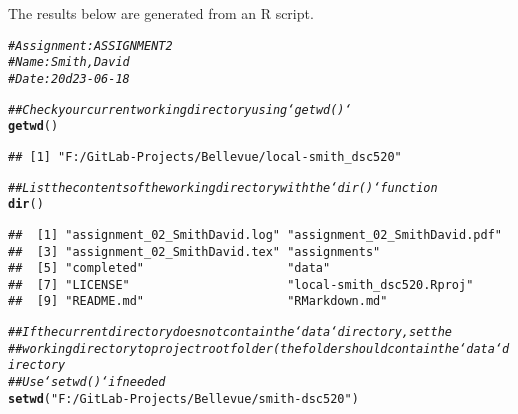 \documentclass{article}\usepackage[]{graphicx}\usepackage[]{xcolor}
\makeatletter
\newcommand{\hlstr}[1]{\textcolor[rgb]{0.192,0.494,0.8}{#1}}%
\newcommand{\hlcom}[1]{\textcolor[rgb]{0.678,0.584,0.686}{\textit{#1}}}%
\newcommand{\hlstd}[1]{\textcolor[rgb]{0.345,0.345,0.345}{#1}}%
\newcommand{\hlkwd}[1]{\textcolor[rgb]{0.737,0.353,0.396}{\textbf{#1}}}%
\newenvironment{kframe}{%
 \def\at@end@of@kframe{}%
 \ifinner\ifhmode%
  \def\at@end@of@kframe{\end{minipage}}%
  \begin{minipage}{\columnwidth}%
 \fi\fi%
 \def\FrameCommand##1{\hskip\@totalleftmargin \hskip-\fboxsep
 \colorbox{shadecolor}{##1}\hskip-\fboxsep
     \hskip-\linewidth \hskip-\@totalleftmargin \hskip\columnwidth}%
 \MakeFramed {\advance\hsize-\width
   \@totalleftmargin\z@ \linewidth\hsize
   \@setminipage}}%
 {\par\unskip\endMakeFramed%
 \at@end@of@kframe}
\newenvironment{knitrout}{}{} %
\makeatother
\begin{document}
\title{\title{\title{\title{\title{\title{}}}}}}



\maketitle
The results below are generated from an R script.

\begin{knitrout}
\color{fgcolor}\begin{kframe}
\begin{alltt}
\hlcom{# Assignment: ASSIGNMENT 2}
\hlcom{# Name: Smith, David}
\hlcom{# Date: 20d23-06-18}

\hlcom{## Check your current working directory using `getwd()`}
\hlkwd{getwd}\hlstd{()}
\end{alltt}
\begin{verbatim}
## [1] "F:/GitLab-Projects/Bellevue/local-smith_dsc520"
\end{verbatim}
\begin{alltt}
\hlcom{## List the contents of the working directory with the `dir()` function}
\hlkwd{dir}\hlstd{()}
\end{alltt}
\begin{verbatim}
##  [1] "assignment_02_SmithDavid.log" "assignment_02_SmithDavid.pdf"
##  [3] "assignment_02_SmithDavid.tex" "assignments"                 
##  [5] "completed"                    "data"                        
##  [7] "LICENSE"                      "local-smith_dsc520.Rproj"    
##  [9] "README.md"                    "RMarkdown.md"
\end{verbatim}
\begin{alltt}
\hlcom{## If the current directory does not contain the `data` directory, set the}
\hlcom{## working directory to project root folder (the folder should contain the `data` directory}
\hlcom{## Use `setwd()` if needed}
\hlkwd{setwd}\hlstd{(}\hlstr{"F:/GitLab-Projects/Bellevue/smith-dsc520"}\hlstd{)}


\end{alltt}
\end{kframe}
\end{knitrout}
\end{document}
